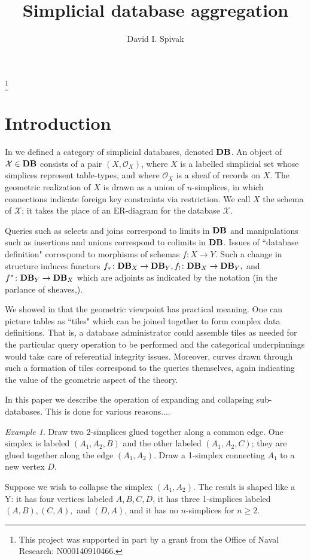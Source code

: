 \documentclass{amsart}
\def\mc{\mathcal}
\def\to{\rightarrow}
\def\taking{\colon}
\def\mcO{\mc{O}}
\def\mcX{\mc{X}}
\theoremstyle{remark}
\newtheorem{example}[theorem]{Example}
\theoremstyle{definition}
\def\DB{{\bf DB}}
\begin{document}
\title{Simplicial database aggregation}

\author{David I. Spivak}

\thanks{This project was supported in part by a grant from the Office of Naval Research: N000140910466.}

\maketitle

\section{Introduction}

In \cite{SD} we defined a category of simplicial databases, denoted $\DB$.  An object of $\mcX\in\DB$ consists of a pair $(X,\mcO_X)$, where $X$ is a labelled simplicial set whose simplices represent table-types, and where $\mcO_X$ is a sheaf of records on $X$.  The geometric realization of $X$ is drawn as a union of $n$-simplices, in which connections indicate foreign key constraints via restriction.  We call $X$ the schema of $\mcX$; it takes the place of an ER-diagram for the database $\mcX$.  

Queries such as selects and joins correspond to limits in $\DB$ and manipulations such as insertions and unions correspond to colimits in $\DB$.  Issues of ``database definition" correspond to morphisms of schemas $f\taking X\to Y$.  Such a change in structure induces functors $f_*\taking\DB_X\to\DB_Y,f_!\taking\DB_X\to\DB_Y,$ and $f^*\taking\DB_Y\to\DB_X$ which are adjoints as indicated by the notation (in the parlance of sheaves,\cite{MM}).

We showed in \cite{TM} that the geometric viewpoint has practical meaning.  One can picture  tables as ``tiles" which can be joined together to form complex data definitions. That is, a database administrator could assemble tiles as needed for the particular query operation to be performed and the categorical underpinnings would take care of referential integrity issues.  Moreover, curves drawn through such a formation of tiles correspond to the queries themselves, again indicating the value of the geometric aspect of the theory.

In this paper we describe the operation of expanding and collapsing sub-databases. This is done for various reasons....  

\begin{example}

Draw two 2-simplices glued together along a common edge.  One simplex is labeled $(A_1,A_2,B)$ and the other labeled $(A_1,A_2,C)$; they are glued together along the edge $(A_1,A_2)$.  Draw a 1-simplex connecting $A_1$ to a new vertex $D$.  

Suppose we wish to collapse the simplex $(A_1,A_2)$. The result is shaped like a Y: it has four vertices labeled $A,B,C,D$, it has three 1-simplices labeled $(A,B),(C,A),$ and $(D,A)$, and it has no $n$-simplices for $n\geq 2$.  

\end{example}
\end{document}
